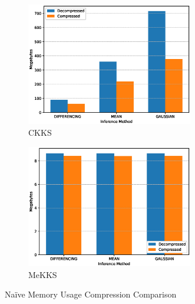 \begin{figure}[h!]
    \centering
    \begin{subfigure}[b]{0.495\textwidth}
        \centering
        \includegraphics[width=0.8\textwidth]{figures/naiveMemUsageCKKS}
        \caption{CKKS}
    \end{subfigure}
    \hfill
    \begin{subfigure}[b]{0.495\textwidth}
        \centering
        \includegraphics[width=0.8\textwidth]{figures/naiveMemUsageMeKKS}
        \caption{MeKKS}
    \end{subfigure}
    \caption{Na\"ive Memory Usage Compression Comparison}
    \label{fig:compression1}
\end{figure}
